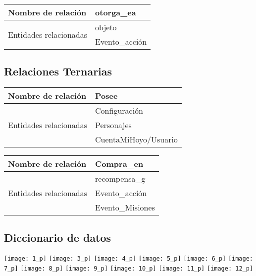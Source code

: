 \documentclass{report}
\begin{document}
\begin{center}    
    \begin{tabular}{|p{3cm}|p{5cm}|}
    \hline
    Nombre de relación& otorga\_ea\\ 
    \hline
    \hline
    \multirow{3}{6em}{Entidades relacionadas}& objeto \\ &Evento\_acción \\ 
    \hline
    \end{tabular}
\end{center}

\subsection{Relaciones Ternarias}
\begin{center}    
    \begin{tabular}{|p{3cm}|p{5cm}|}
    \hline
    Nombre de relación& Posee\\ 
    \hline
    \hline
    \multirow{3}{6em}{Entidades relacionadas}& Configuración \\ &Personajes \\ &CuentaMiHoyo/Usuario\\ 
    \hline
    \end{tabular}
\end{center}

\begin{center}    
    \begin{tabular}{|p{3cm}|p{5cm}|}
    \hline
    Nombre de relación& Compra\_en\\ 
    \hline
    \hline
    \multirow{3}{6em}{Entidades relacionadas}& recompensa\_g \\ &Evento\_acción \\ &Evento\_Misiones\\ 
    \hline
    \end{tabular}
\end{center}

\subsection{Diccionario de datos}
\texttt{[image: 1\_p]}
\newpage
\texttt{[image: 3\_p]}
\texttt{[image: 4\_p]}
\newpage
\texttt{[image: 5\_p]}
\texttt{[image: 6\_p]}
\newpage
\texttt{[image: 7\_p]}
\texttt{[image: 8\_p]}
\newpage
\texttt{[image: 9\_p]}
\texttt{[image: 10\_p]}
\newpage
\texttt{[image: 11\_p]}
\texttt{[image: 12\_p]}
\end{document}
